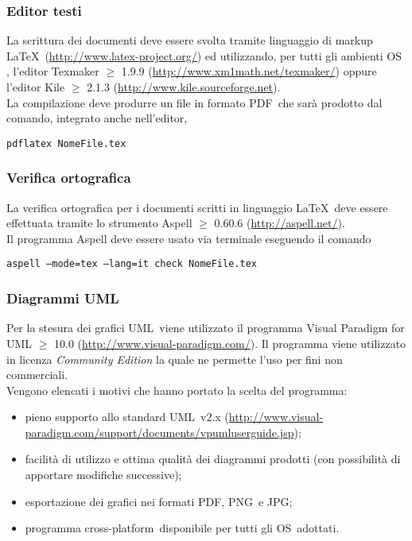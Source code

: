 {{		\subsubsection{Editor testi}\label{TextLaTeX}{
			La scrittura dei documenti deve essere svolta tramite linguaggio di markup\g~ \LaTeX \  (\url{http://www.latex-project.org/}) ed utilizzando, per tutti gli ambienti OS\g~ , l'editor Texmaker $\geqslant$ 1.9.9 (\url{http://www.xm1math.net/texmaker/}) oppure l'editor Kile $\geqslant$ 2.1.3 (\url{http://www.kile.sourceforge.net}).\\
			La compilazione deve produrre un file in formato PDF\g \ che sarà prodotto dal comando, integrato anche nell'editor, 
			\begin{center}
				\texttt{pdflatex NomeFile.tex}
			\end{center}
		}
		\subsubsection{Verifica ortografica}{
			La verifica ortografica per i documenti scritti in linguaggio \LaTeX \ deve essere effettuata tramite lo strumento Aspell $\geqslant$ 0.60.6 (\url{http://aspell.net/}).\\
			Il programma Aspell deve essere usato via terminale eseguendo il comando
			\begin{center}
				\texttt{aspell --mode=tex --lang=it check NomeFile.tex}
			\end{center}
		}
		
		\subsubsection{Diagrammi UML}\label{diaUML}{		
		Per la stesura dei grafici UML\g \ viene utilizzato il programma Visual Paradigm for UML $\geqslant$ 10.0 (\url{http://www.visual-paradigm.com/}). Il programma viene utilizzato in licenza \emph{Community Edition} la quale ne permette l'uso per fini non commerciali.\\
		Vengono elencati i motivi che hanno portato la scelta del programma:
		\begin{itemize}
			\item pieno supporto allo standard UML\g \ v2.x (\url{http://www.visual-paradigm.com/support/documents/vpumluserguide.jsp});
			\item facilità di utilizzo e ottima qualità dei diagrammi prodotti (con possibilità di apportare modifiche successive);
			\item esportazione dei grafici nei formati PDF\g, PNG\g \ e JPG\g;
			\item programma cross-platform\g \ disponibile per tutti gli OS\g \ adottati.
		\end{itemize} 		
		}
		
}}
